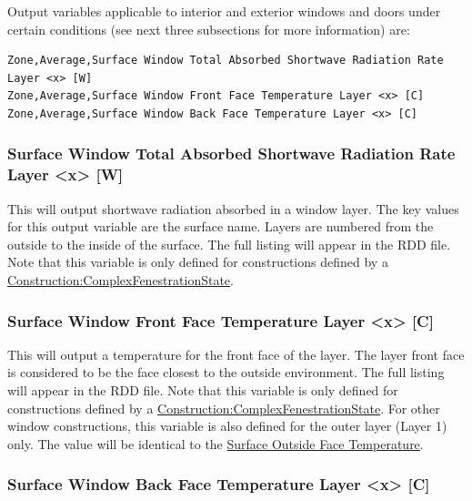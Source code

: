Output variables applicable to interior and exterior windows and doors under certain conditions (see next three subsections for more information) are:

\begin{lstlisting}
Zone,Average,Surface Window Total Absorbed Shortwave Radiation Rate Layer <x> [W]
Zone,Average,Surface Window Front Face Temperature Layer <x> [C]
Zone,Average,Surface Window Back Face Temperature Layer <x> [C]
\end{lstlisting}

\subsubsection{Surface Window Total Absorbed Shortwave Radiation Rate Layer \textless{}x\textgreater{} {[}W{]}}\label{surface-window-total-absorbed-shortwave-radiation-rate-layer-x-w}

This will output shortwave radiation absorbed in a window layer. The key values for this output variable are the surface name. Layers are numbered from the outside to the inside of the surface. The full listing will appear in the RDD file. Note that this variable is only defined for constructions defined by a \hyperref[constructioncomplexfenestrationstate]{Construction:ComplexFenestrationState}.

\subsubsection{Surface Window Front Face Temperature Layer \textless{}x\textgreater{} {[}C{]}}\label{surface-window-front-face-temperature-layer-x-c}

This will output a temperature for the front face of the layer. The layer front face is considered to be the face closest to the outside environment. The full listing will appear in the RDD file. Note that this variable is only defined for constructions defined by a \hyperref[constructioncomplexfenestrationstate]{Construction:ComplexFenestrationState}.  For other window constructions, this variable is also defined for the outer layer (Layer 1) only. The value will be identical to the \hyperref[surface-outside-face-temperature-c]{Surface Outside Face Temperature}.


\subsubsection{Surface Window Back Face Temperature Layer \textless{}x\textgreater{} {[}C{]}}\label{surface-window-back-face-temperature-layer-x-c}

